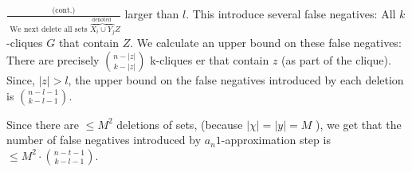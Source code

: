 $\frac{\text { (cont.) }}{\text { We next delete all sets } \overbrace{X_i \cup Y_j}^{\text {denoted }} Z}$ larger than $l$. This introduce several false negatives:
All $k$-cliques $G$ that contain $Z$.
We calculate an upper bound on these false negatives: There are precisely $\binom{n-|z|}{k-|z|}$ k-cliques er that contain $z$ (as part of the clique). Since, $|z|>l$, the upper bound on the false negatives introduced by each deletion is $\binom{n-l-1}{k-l-1}$.

Since there are $\leq M^2$ deletions of sets, (because $|\chi|=|y|=M$ ), we get that the number of false negatives introduced by $a_n 1$-approximation step is $\leq M^2 \cdot\binom{n-t-1}{k-l-1}$.
\fi


 \SetWatermarkText{}

